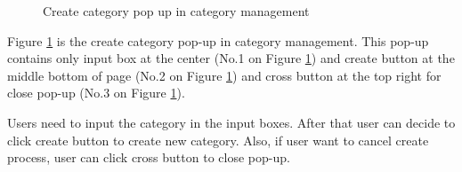 \documentclass[12pt,oneside,openright,a4paper]{cpe-english-project}
\begin{document}
		\begin{figure}[!h]\centering
			\caption{Create category pop up in category management}\label{fig:Create_category_pop_up_in_category_management_done}
		\end{figure}
		\begin{flushleft}
			Figure \ref*{fig:Create_category_pop_up_in_category_management_done} is the create category pop-up in category management. This pop-up contains only input box at the center (No.1 on Figure \ref*{fig:Create_category_pop_up_in_category_management_done}) and create button at the middle bottom of page (No.2 on Figure \ref*{fig:Create_category_pop_up_in_category_management_done}) and cross button at the top right for close pop-up (No.3 on Figure \ref*{fig:Create_category_pop_up_in_category_management_done}).
		\end{flushleft}
		\begin{flushleft}
			Users need to input the category in the input boxes. After that user can decide to click create button to create new category. Also, if user want to cancel create process, user can click cross button to close pop-up.
		\end{flushleft}
\end{document}
